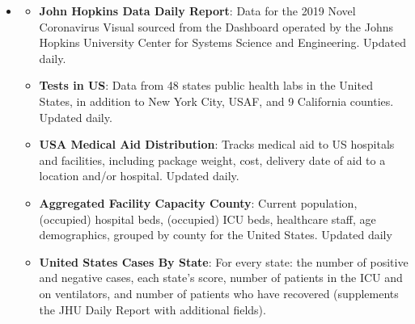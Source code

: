 \documentclass[11pt]{article}
\newcommand{\MYhref}[3][blue]{\href{#2}{\color{#1}{#3}}}%
\begin{document}
\begin{itemize}
    \item \MYhref{https://www.npmjs.com/package/covid19-api}{Covid-19 API}
        \begin{itemize}
        \item \textbf{John Hopkins Data Daily Report}: Data for the 2019 Novel Coronavirus Visual sourced from the Dashboard operated by the Johns Hopkins University Center for Systems Science and Engineering. Updated daily.
        \item \textbf{Tests in US}: Data from 48 states public health labs in the United States, in addition to New York City, USAF, and 9 California counties. Updated daily.
        \item \textbf{USA Medical Aid Distribution}: Tracks medical aid to US hospitals and facilities, including package weight, cost, delivery date of aid to a location and/or hospital. Updated daily.
        \item \textbf{Aggregated Facility Capacity County}: Current population, (occupied) hospital beds, (occupied) ICU beds, healthcare staff, age demographics, grouped by county for the United States. Updated daily 
        \item \textbf{United States Cases By State}: For every state: the number of positive and negative cases, each state's score, number of patients in the ICU and on ventilators, and number of patients who have recovered (supplements the JHU Daily Report with additional fields).
    \end{itemize} 
\end{itemize}
\end{document}
